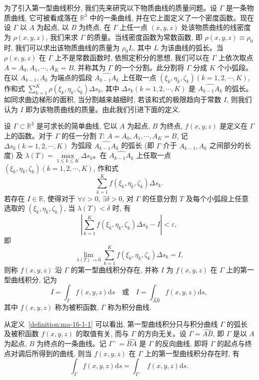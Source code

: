 为了引入第一型曲线积分, 我们先来研究以下物质曲线的质量问题。设 $\Gamma$ 是一条物质曲线, 它可被看成落在 $\mathbb R^3$ 中的一条曲线, 并在它上面定义了一个密度函数。现在设 $\Gamma$ 以 $A$ 为起点, 以 $B$ 为终点, 在 $\Gamma$ 上任一点 $(x,y,z)$ 处该物质曲线的线密度为 $\rho(x,y,z)$, 我们来求 $\Gamma$ 的质量。当线密度函数为常数函数, 即 $\rho(x,y,z)\equiv\rho_0$ 时, 我们可以求出该物质曲线的质量为 $\rho_0L$, 其中 $L$ 为该曲线的弧长。当 $\rho(x,y,z)$ 在 $\Gamma$ 上不是常数函数时, 依照定积分的思想, 我们可以在 $\Gamma$ 上依次取点 $A=A_0,A_1,\cdots,A_K=B$, 并称其为 $\Gamma$ 的一个分割。此分割将 $\Gamma$ 分成 $K$ 个小弧段。在以 $A_{k-1},A_k$ 为端点的弧段 $\widehat{A_{k-1}A_k}$ 上任取一点 $(\xi_k,\eta_k,\zeta_k)(k=1,2,\cdots,K)$, 作和式 $\sum\limits_{k=1}^K \rho(\xi_k,\eta_k,\zeta_k)\Delta s_k$, 其中 $\Delta s_k(k=1,2,\cdots,K)$ 是 $\widehat{A_{k-1}A_k}$ 的弧长。如同求曲边梯形的面积, 当分割越来越细时, 若该和式的极限趋向于常数 $I$, 则我们认为 $I$ 即为该物质曲线的质量。由此我们引进下面的定义.

\begin{definition}\label{definition:ma-16-1-1}
设 $\Gamma\subset\mathbb R^3$ 是可求长的简单曲线, 它以 $A$ 为起点, $B$ 为终点, $f(x,y,z)$ 是定义在 $\Gamma$ 上的函数。对于 $\Gamma$ 的任一分割 $T$: $A=A_0,A_1,\cdots,A_K=B$, 记 $\Delta s_k(k=1,2,\cdots,K)$ 为弧段 $\widehat{A_{k-1}A_k}$ 的弧长 (即 $\Gamma$ 介于 $A_{k-1},A_k$ 之间部分的长度) 及 $\lambda(T)=\max\limits_{1\leqslant k\leqslant K}\Delta s_k$。在 $\widehat{A_{k-1}A_k}$ 上任取一点 $(\xi_k,\eta_k,\zeta_k)(k=1,2,\cdots,K)$, 作和式
\[
  \sum_{k=1}^K f(\xi_k,\eta_k,\zeta_k)\Delta s_k.
\]
若存在 $I\in\mathbb R$, 使得对于 $\forall\varepsilon>0$, $\exists\delta>0$, 对 $\Gamma$ 的任意分割 $T$ 及每个小弧段上任意选取的 $(\xi_k,\eta_k,\zeta_k)$, 当 $\lambda(T)<\delta$ 时, 有
\[
  \left|\sum_{k=1}^K f(\xi_k,\eta_k,\zeta_k)\Delta s_k-I\right|<\varepsilon,
\]
即
\[
  \lim_{\lambda(T)\to0}\sum_{k=1}^K f(\xi_k,\eta_k,\zeta_k)\Delta s_k=I,
\]
则称 $f(x,y,z)$ 沿 $\Gamma$ 的第一型曲线积分存在, 并称 $I$ 为 $f(x,y,z)$ 在 $\Gamma$ 上的第一型曲线积分, 记为
\[
  I=\int_\Gamma f(x,y,z)\mathrm ds
  \quad\text{或}\quad
  I=\int_{\widehat{AB}} f(x,y,z)\mathrm ds,
\]
其中 $f(x,y,z)$ 称为被积函数, $\Gamma$ 称为积分曲线.
\end{definition}

从定义~\ref{definition:ma-16-1-1} 可以看出, 第一型曲线积分只与积分曲线 $\Gamma$ 的弧长及被积函数 $f(x,y,z)$ 的取值有关, 而与 $\Gamma$ 的方向无关。设 $\Gamma=\widehat{AB}$, 即 $\Gamma$ 是以 $A$ 为起点, $B$ 为终点的一条曲线。记 $\Gamma^-=\widehat{BA}$ 是 $\Gamma$ 的反向曲线, 即将 $\Gamma$ 的起点与终点对调后所得到的曲线, 则当 $f(x,y,z)$ 在 $\Gamma$ 上的第一型曲线积分存在时, 有
\[
  \int_\Gamma f(x,y,z)\mathrm ds=\int_{\Gamma^-} f(x,y,z)\mathrm ds.
\]


